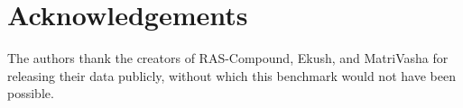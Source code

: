 \documentclass[sn-mathphys-ay]{sn-jnl}
\begin{document}

\maketitle



\section*{Acknowledgements}
The authors thank the creators of RAS-Compound, Ekush, and MatriVasha for releasing their data publicly, without which this benchmark would not have been possible.



\end{document}
